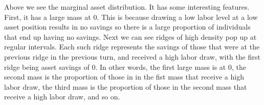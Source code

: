 \documentclass[11pt]{article} %
\begin{document}
Above we see the marginal asset distribution. It has some interesting features. First, it has a large mass at $0$. This is because drawing a low labor level at a low asset position results in no savings so there is a large proportion of individuals that end up having no savings. Next we can see ridges of high density pop up at regular intervals. Each such ridge represents the savings of those that were at the previous ridge in the previous turn, and received a high labor draw, with the first ridge being asset savings of 0. In other words, the first large mass is at 0, the second mass is the proportion of those in in the fist mass that receive a high labor draw, the third mass is the proportion of those in the second mass that receive a high labor draw, and so on.
\end{document}
